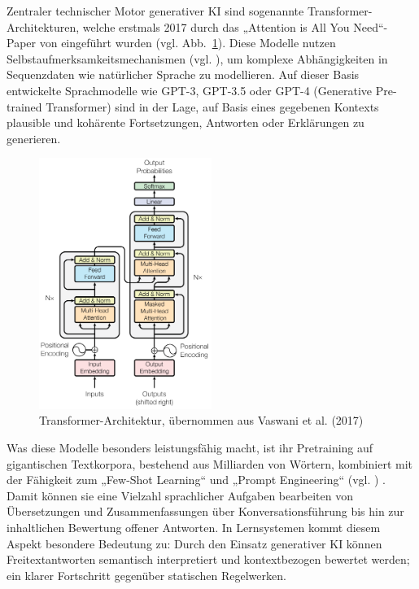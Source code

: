 \documentclass[a4paper,12pt]{article}
\begin{document}
Zentraler technischer Motor generativer KI sind sogenannte Transformer-Architekturen, welche erstmals 2017 durch das „Attention is All You Need“-Paper von \textcite{vaswani2017attention} eingeführt wurden (vgl. Abb.~\ref{fig:transformer}). Diese Modelle nutzen Selbstaufmerksamkeitsmechanismen (vgl. \textcite{vaswani2017attention}), um komplexe Abhängigkeiten in Sequenzdaten wie natürlicher Sprache zu modellieren. Auf dieser Basis entwickelte Sprachmodelle wie GPT-3, GPT-3.5 oder GPT-4 (Generative Pre-trained Transformer) sind in der Lage, auf Basis eines gegebenen Kontexts plausible und kohärente Fortsetzungen, Antworten oder Erklärungen zu generieren.

\begin{figure}[H]
    \centering
    \includegraphics[width=0.5\textwidth]{Bilder/Transformer-Modell}
   \caption{Transformer-Architektur, übernommen aus Vaswani et al. (2017) \cite{vaswani2017attention}}
    \label{fig:transformer}
\end{figure}


Was diese Modelle besonders leistungsfähig macht, ist ihr Pretraining auf gigantischen Textkorpora, bestehend aus Milliarden von Wörtern, kombiniert mit der Fähigkeit zum „Few-Shot Learning“ und „Prompt Engineering“ (vgl. \textcite{brown}) . Damit können sie eine Vielzahl sprachlicher Aufgaben bearbeiten von Übersetzungen und Zusammenfassungen über Konversationsführung bis hin zur inhaltlichen Bewertung offener Antworten. In Lernsystemen kommt diesem Aspekt besondere Bedeutung zu: Durch den Einsatz generativer KI können Freitextantworten semantisch interpretiert und kontextbezogen bewertet werden; ein klarer Fortschritt gegenüber statischen Regelwerken.
\end{document}
